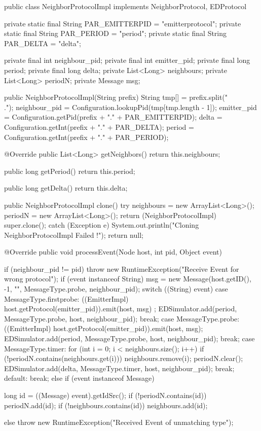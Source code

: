 \documentclass[10pt]{report}
\begin{document}
\begin{boxedlisting}
public class NeighborProtocolImpl implements NeighborProtocol, EDProtocol {

	private static final String PAR_EMITTERPID = "emitterprotocol";
	private static final String PAR_PERIOD = "period";
	private static final String PAR_DELTA = "delta";

	private final int neighbour_pid;
	private final int emitter_pid;
	private final long period;
	private final long delta;
	private List<Long> neighbours;
	private List<Long> periodN;
	private Message msg;
	
	public NeighborProtocolImpl(String prefix) {
		String tmp[] = prefix.split("\\.");
		neighbour_pid = Configuration.lookupPid(tmp[tmp.length - 1]);
		emitter_pid = Configuration.getPid(prefix + "." + PAR_EMITTERPID);
		delta = Configuration.getInt(prefix + "." + PAR_DELTA);
		period = Configuration.getInt(prefix + "." + PAR_PERIOD);
	}

	@Override
	public List<Long> getNeighbors() {
		return this.neighbours;
	}

	public long getPeriod() {
		return this.period;
	}

	public long getDelta() {
		return this.delta;
	}

	public NeighborProtocolImpl clone() {
		try {
			neighbours = new ArrayList<Long>();
			periodN = new ArrayList<Long>();
			return (NeighborProtocolImpl) super.clone();
		} catch (Exception e) {
			System.out.println("Cloning NeighborProtocolImpl Failed !");
		}
		return null;
	}

	@Override
	public void processEvent(Node host, int pid, Object event) {
		if (neighbour_pid != pid) {
			throw new RuntimeException("Receive Event for wrong protocol");
		}
		if (event instanceof String) {
			msg = new Message(host.getID(), -1, "", MessageType.probe, neighbour_pid);
			switch ((String) event) {
			case MessageType.firstprobe:
				((EmitterImpl) host.getProtocol(emitter_pid)).emit(host, msg) ;
				EDSimulator.add(period, MessageType.probe, host, neighbour_pid);
				break;
			case MessageType.probe:
				((EmitterImpl) host.getProtocol(emitter_pid)).emit(host, msg);
				EDSimulator.add(period, MessageType.probe, host, neighbour_pid);
				break;
			case MessageType.timer:
				for (int i = 0; i < neighbours.size(); i++) {
					if (!periodN.contains(neighbours.get(i))) {
						neighbours.remove(i);
					}
				}
				periodN.clear();
				EDSimulator.add(delta, MessageType.timer, host, neighbour_pid);
				break;
			default:
				break;
			}
		} else if (event instanceof Message) {
			long id = ((Message) event).getIdSrc();
			if (!periodN.contains(id)) {
				periodN.add(id);
			}
			if (!neighbours.contains(id)) {
				neighbours.add(id);
			}
			
		} else {
			throw new RuntimeException("Received Event of unmatching type");
		}
	}
}
\end{boxedlisting}
\end{document}

